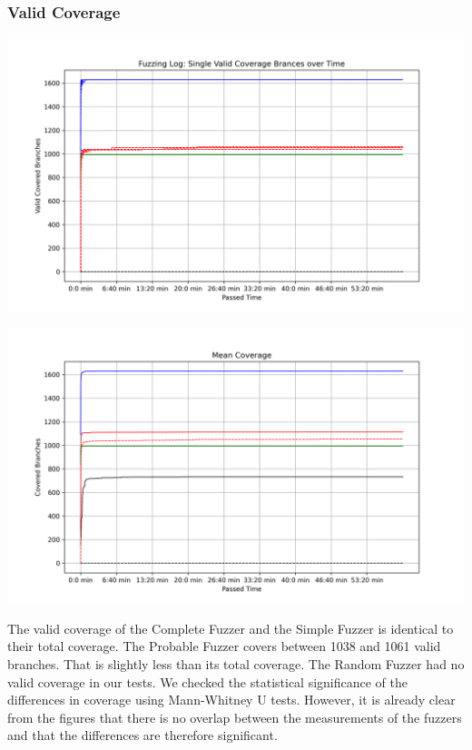 \documentclass[runningheads]{llncs}
\begin{document}
\subsubsection{Valid Coverage}
\begin{center}
\includegraphics[width=\textwidth]{img/valid_coverage}
\label{fig3}
\end{center}

\begin{center}
\includegraphics[width=\textwidth]{img/average_coverage}
\label{fig4}
\end{center}
The valid coverage of the Complete Fuzzer and the Simple Fuzzer is identical to their total coverage. The Probable Fuzzer covers between 1038 and 1061 valid branches. That is slightly less than its total coverage. The Random Fuzzer had no valid coverage in our tests.\newline
We checked the statistical significance of the differences in coverage using Mann-Whitney U tests. However, it is already clear from the figures that there is no overlap between the measurements of the fuzzers and that the differences are therefore significant.
\end{document}
